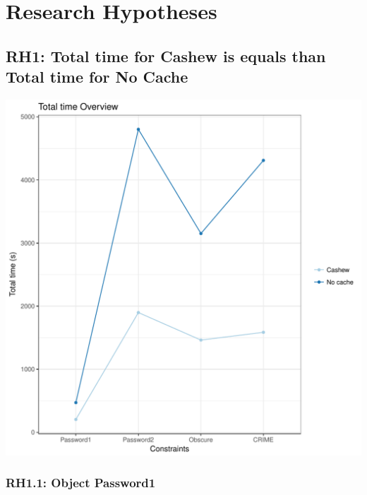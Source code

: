 \documentclass{article}\usepackage[]{graphicx}\usepackage[]{color}
\makeatletter
\def\maxwidth{ %
  \ifdim\Gin@nat@width>\linewidth
    \linewidth
  \else
    \Gin@nat@width
  \fi
}
\newenvironment{knitrout}{}{} %
\makeatother
\begin{document}
\section{Research Hypotheses}

\subsection{RH1: Total time for Cashew is equals than Total time for No Cache}


 
\begin{knitrout}
\color{fgcolor}
\includegraphics[width=\maxwidth]{figure/overview_RH1-1} 

\end{knitrout}
 	

\subsubsection{RH1.1: Object Password1}
\end{document}
